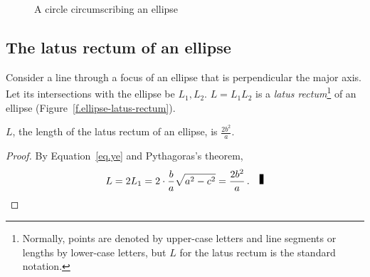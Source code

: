 \begin{figure}[tb]
\begin{center}
\caption{A circle circumscribing an ellipse}\label{f.ellipse-circle}
\end{center}
\end{figure}


\subsection{The latus rectum of an ellipse}

\begin{definition}\label{def.ellipse-lr}
Consider a line through a focus of an ellipse that is perpendicular the major axis. Let its intersections with the ellipse be $L_1,L_2$. $L=L_1L_2$ is a \emph{latus rectum}\footnote{Normally, points are denoted by upper-case letters and line segments or lengths by lower-case letters, but $L$ for the latus rectum is the standard notation.} of an ellipse (Figure~\ref{f.ellipse-latus-rectum}).
\end{definition}
\begin{theorem}\label{thm.ellipse-lr}
$L$, the length of the latus rectum of an ellipse, is 
$\displaystyle\frac{2b^2}{a}$.
\end{theorem}
\begin{proof}
By Equation~\ref{eq.ye} and Pythagoras's theorem,
\[
L=2L_1=2\cdot\frac{b}{a}\sqrt{a^2-c^2}=\displaystyle\frac{2b^2}{a}\,.\fqed
\]
\end{proof}


